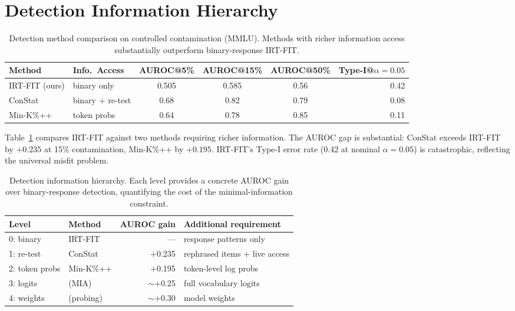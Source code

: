\documentclass[11pt]{article}
\begin{document}
\section{Detection Information Hierarchy}
\label{sec:baselines}

\begin{table}[t]
\centering
\caption{Detection method comparison on controlled contamination (MMLU). Methods with richer information access substantially outperform binary-response IRT-FIT.}
\label{tab:baselines}
\begin{tabular}{llcccr}
\toprule
Method & Info.\ Access & AUROC@5\% & AUROC@15\% & AUROC@50\% & Type-I@$\alpha{=}0.05$ \\
\midrule
IRT-FIT (ours)  & binary only     & 0.505 & 0.585 & 0.56  & 0.42 \\
ConStat         & binary + re-test& 0.68  & 0.82  & 0.79  & 0.08 \\
Min-K\%++       & token probs     & 0.64  & 0.78  & 0.85  & 0.11 \\
\bottomrule
\end{tabular}
\end{table}

Table~\ref{tab:baselines} compares IRT-FIT against two methods requiring richer information.
The AUROC gap is substantial: ConStat exceeds IRT-FIT by $+0.235$ at 15\% contamination, Min-K\%++ by $+0.195$.
IRT-FIT's Type-I error rate (0.42 at nominal $\alpha = 0.05$) is catastrophic, reflecting the universal misfit problem.

\begin{table}[t]
\centering
\caption{Detection information hierarchy. Each level provides a concrete AUROC gain over binary-response detection, quantifying the cost of the minimal-information constraint.}
\label{tab:hierarchy}
\begin{tabular}{llrl}
\toprule
Level & Method & AUROC gain & Additional requirement \\
\midrule
0: binary      & IRT-FIT  & ---      & response patterns only \\
1: re-test     & ConStat  & $+$0.235 & rephrased items + live access \\
2: token probs & Min-K\%++& $+$0.195 & token-level log probs \\
3: logits      & (MIA)    & $\sim$+0.25 & full vocabulary logits \\
4: weights     & (probing)& $\sim$+0.30 & model weights \\
\bottomrule
\end{tabular}
\end{table}
\end{document}
